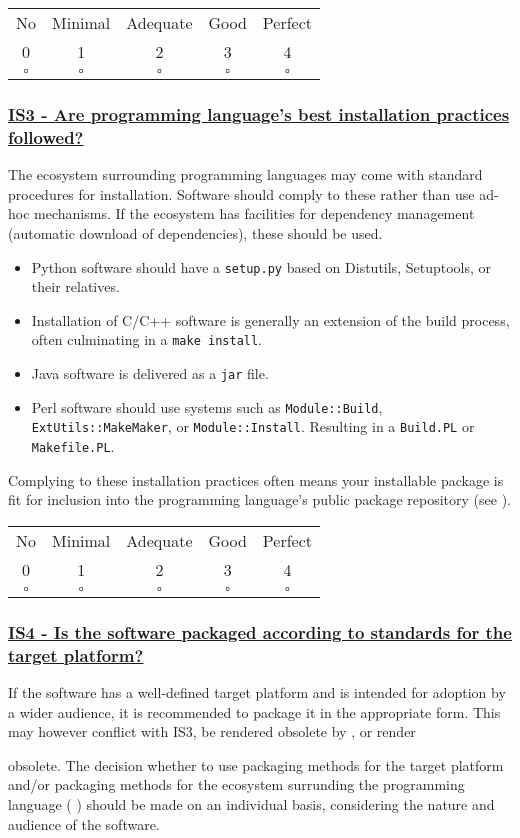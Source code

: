 \documentclass[a4paper,11pt]{article}
\newcommand{\criterion}[2]{\subsubsection*{\underline{#1 - #2}}\label{id:#1}}
\newcommand\CheckTable{%
  \begin{tabular}{ccccc}
    No & Minimal & Adequate & Good & Perfect \\
    0 & 1 & 2 & 3 & 4 \\
    \hline
    $\square$ & $\square$ & $\square$ & $\square$ & $\square$ \\
  \end{tabular}%
}
\newcommand{\refcrit}[1]{%
 \framebox[1.1\width]{\hyperref[id:#1]{#1}}
}
\begin{document}
\CheckTable

\newcommand{\isThreeID}{IS3}
\newcommand{\isThreeText}{Are programming language's best installation practices followed?}
\criterion{\isThreeID}{\isThreeText}

The ecosystem surrounding programming languages may come with standard
procedures for installation. Software should comply to these rather than use
ad-hoc mechanisms. If the ecosystem has facilities for dependency management
(automatic download of dependencies), these should be used.

\begin{itemize}
 \item Python software should have a \texttt{setup.py} based on Distutils,
     Setuptools, or their relatives.
 \item Installation of C/C++ software is generally an extension of the build
     process, often culminating in a \texttt{make install}.
 \item Java software is delivered as a \texttt{jar} file.
 \item Perl software should use systems such as \texttt{Module::Build},
     \texttt{ExtUtils::MakeMaker}, or \texttt{Module::Install}. Resulting in a
     \texttt{Build.PL} or \texttt{Makefile.PL}.
\end{itemize}

Complying to these installation practices often means your installable package
is fit for inclusion into the programming language's public package repository
(see \refcrit{AC5}).

\CheckTable

\newcommand{\isFourID}{IS4}
\newcommand{\isFourText}{Is the software packaged according to standards for the target platform?}
\criterion{\isFourID}{\isFourText}

If the software has a well-defined target platform and is intended for adoption
by a wider audience, it is recommended to package it in the appropriate form.
This may however conflict with IS3, be rendered obsolete by \refcrit{IS3}, or
render \refcrit{IS3}
obsolete. The decision whether to use packaging methods for the target platform
and/or packaging methods for the ecosystem surrunding the programming language
(\refcrit{IS3}) should be
%
%
%
made on an individual basis, considering the nature and audience of the
software.
\end{document}

